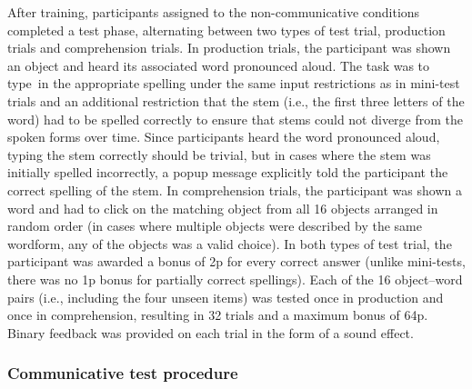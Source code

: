 \documentclass[doc,biblatex]{apa7}
\begin{document}
After training, participants assigned to the non-communicative conditions completed a test phase, alternating between two types of test trial, production trials and comprehension trials. In production trials, the participant was shown an object and heard its associated word pronounced aloud. The task was to type~in the appropriate spelling under the same input restrictions as in mini-test trials and an additional restriction that the stem (i.e., the first three letters of the word) had to be spelled correctly to ensure that stems could not diverge from the spoken forms over time. Since participants heard the word pronounced aloud, typing the stem correctly should be trivial, but in cases where the stem was initially spelled incorrectly, a popup message explicitly told the participant the correct spelling of the stem. In comprehension trials, the participant was shown a word and had to click on the matching object from all 16 objects arranged in random order (in cases where multiple objects were described by the same wordform, any of the objects was a valid choice). In both types of test trial, the participant was awarded a bonus of 2p for every correct answer (unlike mini-tests, there was no 1p bonus for partially correct spellings). Each of the 16 object--word pairs (i.e., including the four unseen items) was tested once in production and once in comprehension, resulting in 32 trials and a maximum bonus of 64p. Binary feedback was provided on each trial in the form of a sound effect.

\subsubsection{Communicative test procedure}
\end{document}
